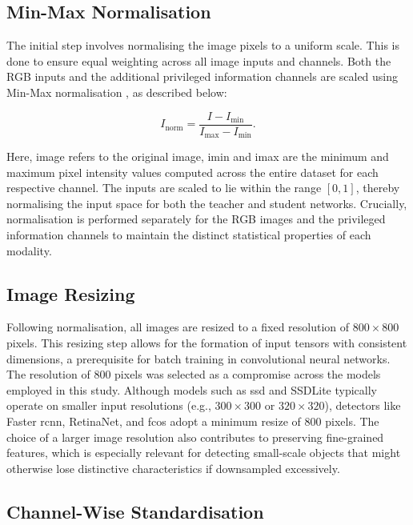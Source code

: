 \subsection{Min-Max Normalisation}
\label{subsec:4_normalisation}

The initial step involves normalising the image pixels to a uniform scale. This is done to ensure equal weighting across all image inputs and channels. Both the RGB inputs and the additional privileged information channels are scaled using Min-Max normalisation \cite{min_max_normalisation}, as described below:

\begin{equation} \label{eq:min_max}
I_{\text{norm}} = \frac{I - I_{\text{min}}}{I_{\text{max}} - I_{\text{min}}} .
\end{equation}

\noindent Here, \gls{image} refers to the original image, \gls{imin} and \gls{imax} are the minimum and maximum pixel intensity values computed across the entire dataset for each respective channel. The inputs are scaled to lie within the range $[0, 1]$, thereby normalising the input space for both the teacher and student networks. Crucially, normalisation is performed separately for the RGB images and the privileged information channels to maintain the distinct statistical properties of each modality. 

\subsection{Image Resizing}
\label{subsec:4_resizing}

Following normalisation, all images are resized to a fixed resolution of $800 \times 800$ pixels. This resizing step allows for the formation of input tensors with consistent dimensions, a prerequisite for batch training in convolutional neural networks. The resolution of $800$ pixels was selected as a compromise across the models employed in this study.
Although models such as \gls{ssd} and SSDLite typically operate on smaller input resolutions (e.g., $300 \times 300$ or $320 \times 320$), detectors like Faster \gls{rcnn}, RetinaNet, and \gls{fcos} adopt a minimum resize of $800$ pixels. The choice of a larger image resolution also contributes to preserving fine-grained features, which is especially relevant for detecting small-scale objects that might otherwise lose distinctive characteristics if downsampled excessively.

\subsection{Channel-Wise Standardisation}
\label{subsec:4_standardisation}

